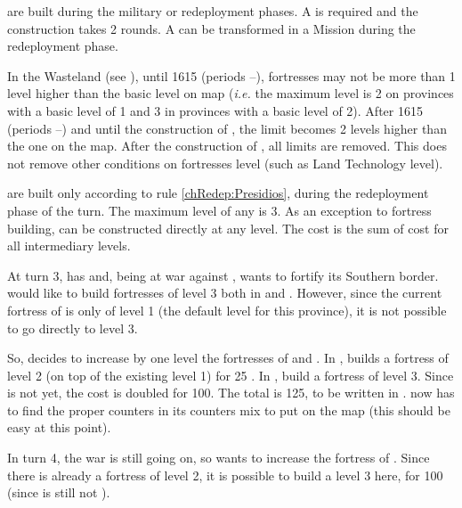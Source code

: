 \aparag[Forts] are built during the military or redeployment phases.
\bparag A \LD is required and the construction takes 2 rounds.
\bparag A \LeaderMis can be transformed in a Mission during the redeployment
phase.

\aparag[Wasteland]\label{chLogistic:Fortresses Wasteland} In the Wasteland (see
), until 1615 (periods --),
fortresses may not be more than 1 level higher than the basic level on map
(\emph{i.e.} the maximum level is 2 on provinces with a basic level of 1 and 3
in provinces with a basic level of 2).
\bparag After 1615 (periods --) and until the
construction of , the limit becomes 2 levels higher
than the one on the map.
\bparag After the construction of , all limits are
removed.
\bparag This does not remove other conditions on fortresses level (such as
Land Technology level).

\aparag[\Presidios] are built only according to rule \ref{chRedep:Presidios},
during the redeployment phase of the turn. The maximum level of any \Presidio
is 3.
\bparag As an exception to fortress building, \Presidio can be constructed
directly at any level. The cost is the sum of cost for all intermediary
levels.

\begin{exemple}
  At turn 3, \FRA has \TREN and, being at war against \HIS, wants to fortify
  its Southern border. \FRA would like to build fortresses of level 3 both in
  \provinceBearn and \provinceLanguedoc. However, since the current fortress
  of \provinceLanguedoc is only of level 1 (the default level for this
  province), it is not possible to go directly to level 3.

  So, \FRA decides to increase by one level the fortresses of \provinceBearn
  and \provinceLanguedoc. In \provinceLanguedoc, \FRA builds a fortress of
  level 2 (on top of the existing level 1) for 25 \ducats. In \provinceBearn,
  \FRA build a fortress of level 3. Since \FRA is not \TARQ yet, the cost is
  doubled for 100\ducats. The total is 125\ducats, to be written in
  . \FRA now has to find the proper counters in
  its counters mix to put on the map (this should be easy at this point).

  In turn 4, the war is still going on, so \FRA wants to increase the fortress
  of \provinceLanguedoc. Since there is already a fortress of level 2, it is
  possible to build a level 3 here, for 100 \ducats (since \FRA is still not
  \TARQ).
\end{exemple}

